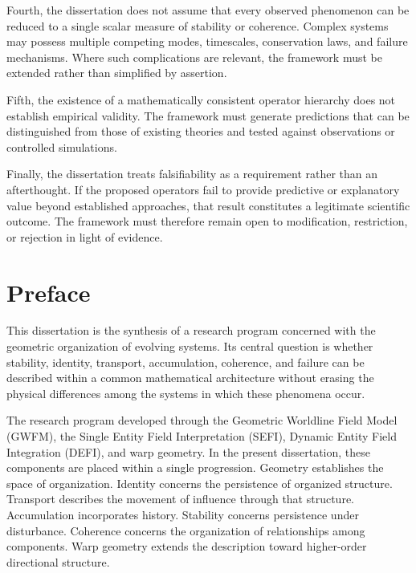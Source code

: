 \documentclass[12pt,oneside]{book}
\begin{document}
Fourth, the dissertation does not assume that every observed
phenomenon can be reduced to a single scalar measure of
stability or coherence. Complex systems may possess multiple
competing modes, timescales, conservation laws, and failure
mechanisms. Where such complications are relevant, the
framework must be extended rather than simplified by assertion.

Fifth, the existence of a mathematically consistent operator
hierarchy does not establish empirical validity. The framework
must generate predictions that can be distinguished from those
of existing theories and tested against observations or
controlled simulations.

Finally, the dissertation treats falsifiability as a
requirement rather than an afterthought. If the proposed
operators fail to provide predictive or explanatory value
beyond established approaches, that result constitutes a
legitimate scientific outcome. The framework must therefore
remain open to modification, restriction, or rejection in light
of evidence.


\cleardoublepage
\tableofcontents


\cleardoublepage
\listoffigures
{}


\cleardoublepage
\chapter*{Preface}

This dissertation is the synthesis of a research program
concerned with the geometric organization of evolving systems.
Its central question is whether stability, identity, transport,
accumulation, coherence, and failure can be described within a
common mathematical architecture without erasing the physical
differences among the systems in which these phenomena occur.

The research program developed through the Geometric Worldline
Field Model (GWFM), the Single Entity Field Interpretation
(SEFI), Dynamic Entity Field Integration (DEFI), and warp
geometry. In the present dissertation, these components are
placed within a single progression. Geometry establishes the
space of organization. Identity concerns the persistence of
organized structure. Transport describes the movement of
influence through that structure. Accumulation incorporates
history. Stability concerns persistence under disturbance.
Coherence concerns the organization of relationships among
components. Warp geometry extends the description toward
higher-order directional structure.
\end{document}
